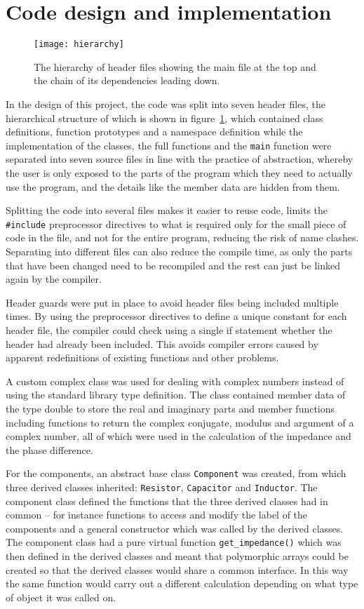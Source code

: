 \section{Code design and implementation}
\label{sec:code}
\begin{figure}
  \begin{center}
    \texttt{[image: hierarchy]}
  \end{center}
  \caption{The hierarchy of header files showing the main file at the top and the chain of its dependencies leading down.}
  \label{fig:hierarchy}
\end{figure}
In the design of this project, the code was split into seven header files, the hierarchical structure of which is shown in figure~\ref{fig:hierarchy}, which contained class definitions, function prototypes and a namespace definition while the implementation of the classes, the full functions and the \verb!main! function were separated into seven source files in line with the practice of abstraction, whereby the user is only exposed to the parts of the program which they need to actually use the program, and the details like the member data are hidden from them.

Splitting the code into several files makes it easier to reuse code, limits the \verb!#include! preprocessor directives to what is required only for the small piece of code in the file, and not for the entire program, reducing the risk of name clashes. Separating into different files can also reduce the compile time, as only the parts that have been changed need to be recompiled and the rest can just be linked again by the compiler.

Header guards were put in place to avoid header files being included multiple times. By using the preprocessor directives to define a unique constant for each header file, the compiler could check using a single if statement whether the header had already been included. This avoids compiler errors caused by apparent redefinitions of existing functions and other problems.

A custom complex class was used for dealing with complex numbers instead of using the standard library type definition. The class contained member data of the type double to store the real and imaginary parts and member functions including functions to return the complex conjugate, modulus and argument of a complex number, all of which were used in the calculation of the impedance and the phase difference.

For the components, an abstract base class \verb!Component! was created, from which three derived classes inherited: \verb!Resistor!, \verb!Capacitor! and \verb!Inductor!. The component class defined the functions that the three derived classes had in common -- for instance functions to access and modify the label of the components and a general constructor which was called by the derived classes. The component class had a pure virtual function \verb!get_impedance()! which was then defined in the derived classes and meant that polymorphic arrays could be created so that the derived classes would share a common interface. In this way the same function would carry out a different calculation depending on what type of object it was called on.

